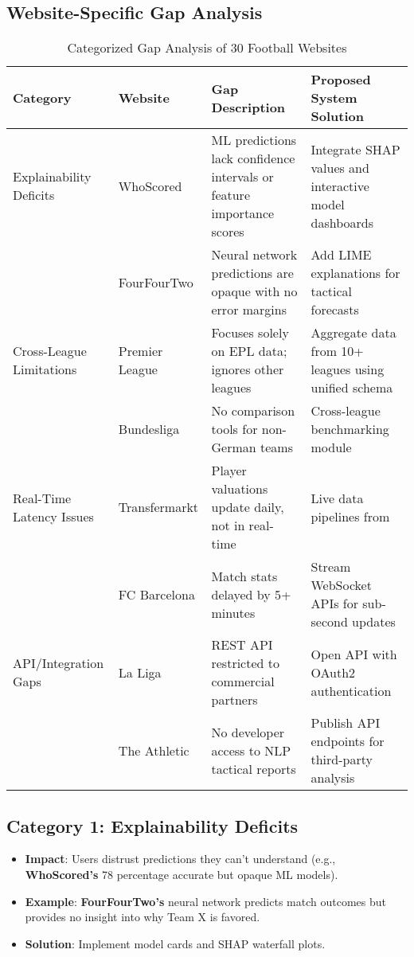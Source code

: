 \subsection{Website-Specific Gap Analysis}
\begin{table}[h!]
\centering
\caption{Categorized Gap Analysis of 30 Football Websites}
\label{tab:gap-categories}
\scriptsize
\begin{tabularx}{\textwidth}{|l|l|X|X|}
\hline
\textbf{Category} & \textbf{Website} & \textbf{Gap Description} & \textbf{Proposed System Solution} \\
\hline
Explainability Deficits & WhoScored & ML predictions lack confidence intervals or feature importance scores & Integrate SHAP values and interactive model dashboards \\
\cline{2-4}
& FourFourTwo & Neural network predictions are opaque with no error margins & Add LIME explanations for tactical forecasts \\
\hline
Cross-League Limitations & Premier League & Focuses solely on EPL data; ignores other leagues & Aggregate data from 10+ leagues using unified schema \\
\cline{2-4}
& Bundesliga & No comparison tools for non-German teams & Cross-league benchmarking module \\
\hline
Real-Time Latency Issues & Transfermarkt & Player valuations update daily, not in real-time & Live data pipelines from \cite{flashscore} \\
\cline{2-4}
& FC Barcelona & Match stats delayed by 5+ minutes & Stream WebSocket APIs for sub-second updates \\
\hline
API/Integration Gaps & La Liga & REST API restricted to commercial partners & Open API with OAuth2 authentication \\
\cline{2-4}
& The Athletic & No developer access to NLP tactical reports & Publish API endpoints for third-party analysis \\
\hline
\end{tabularx}
\end{table}



\subsection{Category 1: Explainability Deficits}
\begin{itemize}
\item \textbf{Impact}: Users distrust predictions they can’t understand (e.g., \textbf{WhoScored’s} 78 percentage accurate but opaque ML models).
\item \textbf{Example}: \textbf{FourFourTwo’s} neural network predicts match outcomes but provides no insight into why Team X is favored.
\item \textbf{Solution}: Implement model cards and SHAP waterfall plots.
\end{itemize}

